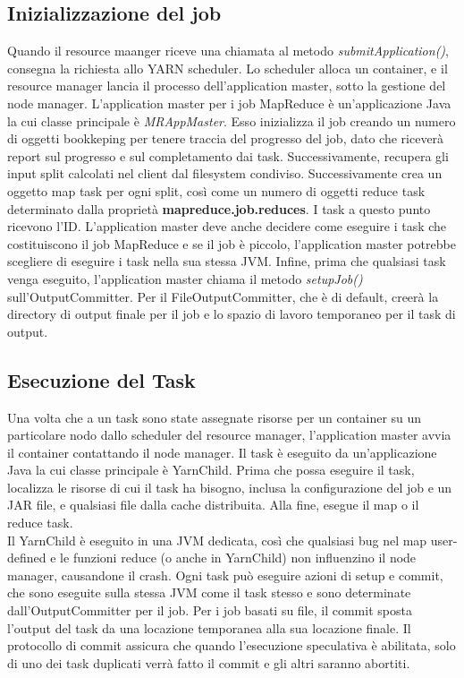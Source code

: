 \subsection{Inizializzazione del job}
Quando il resource maanger riceve una chiamata al metodo \textit{submitApplication()}, consegna la richiesta allo YARN scheduler. Lo scheduler alloca un container, e il resource manager lancia il processo dell'application master, sotto la gestione del node manager. L'application master per i job MapReduce è un'applicazione Java la cui classe principale è \textit{MRAppMaster}. Esso inizializza il job creando un numero di oggetti bookkeping per tenere traccia del progresso del job, dato che riceverà report sul progresso e sul completamento dai task. Successivamente, recupera gli input split calcolati nel client dal filesystem condiviso. Successivamente crea un oggetto map task per ogni split, così come un numero di oggetti reduce task determinato dalla proprietà \textbf{mapreduce.job.reduces}. I task a questo punto ricevono l'ID. L'application master deve anche decidere come eseguire i task che costituiscono il job MapReduce e se il job è piccolo, l'application master potrebbe scegliere di eseguire i task nella sua stessa JVM. Infine, prima che qualsiasi task venga eseguito, l'application master chiama il metodo \textit{setupJob()} sull'OutputCommitter. Per il FileOutputCommitter, che è di default, creerà la directory di output finale per il job e lo spazio di lavoro temporaneo per il task di output.
\subsection{Esecuzione del Task}
Una volta che a un task sono state assegnate risorse per un container su un particolare nodo dallo scheduler del resource manager, l'application master avvia il container contattando il node manager. Il task è eseguito da un'applicazione Java la cui classe principale è YarnChild. Prima che possa eseguire il task, localizza le risorse di cui il task ha bisogno, inclusa la configurazione del job e un JAR file, e qualsiasi file dalla cache distribuita. Alla fine, esegue il map o il reduce task. \\
Il YarnChild è eseguito in una JVM dedicata, così che qualsiasi bug nel map user-defined e le funzioni reduce (o anche in YarnChild) non influenzino il node manager, causandone il crash.\newline
Ogni task può eseguire azioni di setup e commit, che sono eseguite sulla stessa JVM come il task stesso e sono determinate dall'OutputCommitter per il job. Per i job basati su file, il commit sposta l'output del task da una locazione temporanea alla sua locazione finale. Il protocollo di commit assicura che quando l'esecuzione speculativa è abilitata, solo di uno dei task duplicati verrà fatto il commit e gli altri saranno abortiti.
